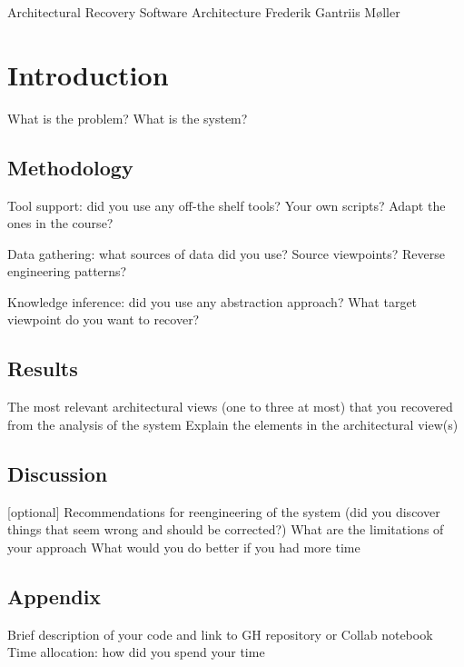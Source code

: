 \documentclass{solutionclass} %
\begin{document}
\pretitle
{Architectural Recovery}               %
{Software Architecture}        %
{Frederik Gantriis Møller}                 %

\def\homeworkNumber{5}

\makeatletter
    \startcontents[sections]
    \chapter{Introduction}
\makeatother

What is the problem?
What is the system? 

\section{Methodology}
Tool support: did you use any off-the shelf tools? Your own scripts? Adapt the ones in the course?

Data gathering: what sources of data did you use? Source viewpoints? Reverse engineering patterns? 

Knowledge inference: did you use any abstraction approach? What target viewpoint do you want to recover? 

\section{Results}
The most relevant architectural views (one to three at most) that you recovered from the analysis of the system
Explain the elements in the architectural view(s)

\section{Discussion} 
[optional] Recommendations for reengineering of the system (did you discover things that seem wrong and should be corrected?)
What are the limitations of your approach 
What would you do better if you had more time

\section{Appendix}
Brief description of your code and link to GH repository or Collab notebook
Time allocation: how did you spend your time
    
    \thispagestyle{fancyplain}
    \fancyhead{}
    \renewcommand{\headrulewidth}{0pt}
\end{document}
